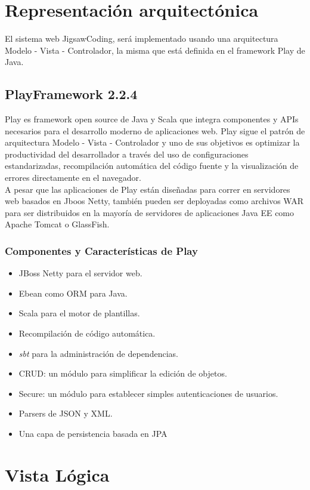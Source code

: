 \section{Representación arquitectónica}
El sistema web JigsawCoding, será implementado usando una arquitectura Modelo - Vista - Controlador, la misma que está definida en el framework Play de Java.
\subsection{PlayFramework 2.2.4}
Play es framework open source de Java y Scala que integra componentes y APIs necesarios para el desarrollo moderno de aplicaciones web. Play sigue el patrón de arquitectura Modelo - Vista - Controlador y uno de sus objetivos es optimizar la productividad del desarrollador a través del uso de configuraciones estandarizadas, recompilación automática del código fuente y la visualización de errores directamente en el navegador.\\

A pesar que las aplicaciones de Play están diseñadas para correr en servidores web basados en Jboos Netty, también pueden ser deployadas como archivos WAR para ser distribuidos en la mayoría de servidores de aplicaciones Java EE como Apache Tomcat o GlassFish.

\subsubsection{Componentes y Características de Play}
\begin{itemize}
  \item JBoss Netty para el servidor web.
  \item Ebean como ORM para Java.
  \item Scala para el motor de plantillas.
  \item Recompilación de código automática.
  \item \emph{sbt} para la administración de dependencias.
  \item CRUD: un módulo para simplificar la edición de objetos.
  \item Secure: un módulo para establecer simples autenticaciones de usuarios.
  \item Parsers de JSON y XML.
  \item Una capa de persistencia basada en JPA
\end{itemize}
\clearpage
\section{Vista Lógica}
\clearpage
